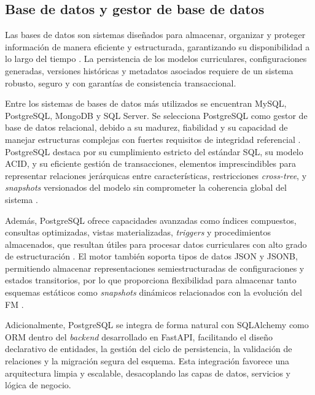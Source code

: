 \subsection{Base de datos y gestor de base de datos}

Las bases de datos son sistemas diseñados para almacenar, organizar y 
proteger información de manera eficiente y estructurada, garantizando su 
disponibilidad a lo largo del tiempo \citep{sciencedirect_dbms}.
La persistencia de los modelos curriculares, configuraciones generadas, 
versiones históricas y metadatos asociados requiere de un sistema robusto, 
seguro y con garantías de consistencia transaccional. 

Entre los sistemas de bases de 
datos más utilizados se encuentran MySQL, PostgreSQL, MongoDB y SQL Server. Se 
selecciona PostgreSQL como gestor de base de datos relacional, debido a su madurez, 
fiabilidad y su capacidad de manejar estructuras complejas con fuertes requisitos 
de integridad referencial \citep{postgres2024, momjian2001postgresql}. 
PostgreSQL destaca por su cumplimiento estricto del 
estándar \ac{SQL}, su modelo \ac{ACID}, y su eficiente gestión de transacciones, elementos 
imprescindibles para representar relaciones jerárquicas entre características, 
restricciones \textit{cross-tree}, y \textit{snapshots} versionados del modelo sin comprometer la 
coherencia global del sistema \citep{momjian2001postgresql}.

Además, PostgreSQL ofrece capacidades avanzadas como índices compuestos, consultas 
optimizadas, vistas materializadas, \textit{triggers} y procedimientos almacenados, que 
resultan útiles para procesar datos curriculares con alto grado de estructuración \citep{postgres2024}. 
El motor también soporta tipos de datos \ac{JSON} y \ac{JSONB}, permitiendo almacenar 
representaciones semiestructuradas de configuraciones y estados transitorios, por 
lo que proporciona flexibilidad para almacenar tanto esquemas estáticos como 
\textit{snapshots} dinámicos relacionados con la evolución del \ac{FM} 
\citep{postgres2024}.

Adicionalmente, PostgreSQL se integra de forma natural con SQLAlchemy como \ac{ORM} 
dentro del \textit{backend} desarrollado en FastAPI, facilitando el diseño declarativo de 
entidades, la gestión del ciclo de persistencia, la validación de relaciones y la 
migración segura del esquema. Esta integración favorece una arquitectura limpia y 
escalable, desacoplando las capas de datos, servicios y lógica de negocio.

